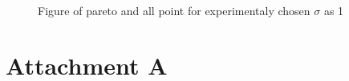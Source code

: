 \documentclass[a4paper, 11pt]{article}
\begin{document}
	\begin{figure}[H]
        \centering
        \qquad
        \caption{Figure of pareto and all point for experimentaly chosen $\sigma$ as 1}
        \label{fig:sigmaInfluenceLowValue}
    \end{figure}

	\newpage

	\section*{Attachment A}
	
\end{document}

